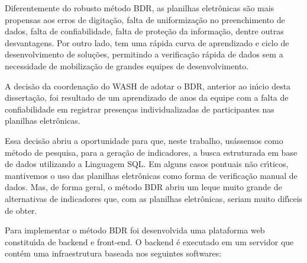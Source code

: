 \documentclass[
12pt,		%
openright,	%
twoside,  %
a4paper,			%
chapter=TITLE,		%
english,			%
french,				%
spanish,			%
brazil				%
]{USPSC-classe/USPSC}
\begin{document}
Diferentemente do robusto m\'etodo BDR, as planilhas eletr\^onicas s\~ao mais propensas aos erros de digita\c{c}\~ao, falta de uniformiza\c{c}\~ao no preenchimento de dados, falta de confiabilidade, falta de prote\c{c}\~ao da informa\c{c}\~ao, dentre outras desvantagens. Por outro lado, tem uma r\'apida curva de aprendizado e ciclo de desenvolvimento de solu\c{c}\~oes, permitindo a verifica\c{c}\~ao r\'apida de dados sem a necessidade de mobiliza\c{c}\~ao de grandes equipes de desenvolvimento.

















A decis\~ao da coordena\c{c}\~ao do WASH de adotar o BDR, anterior ao in\'{\i}cio desta disserta\c{c}\~ao, foi resultado de um aprendizado de anos da equipe com a falta de confiabilidade em registrar presen\c{c}as individualizadas de participantes nas planilhas eletr\^onicas.

















Essa decis\~ao abriu a oportunidade para que, neste trabalho, us\'assemos como m\'etodo de pesquisa, para a gera\c{c}\~ao de indicadores, a busca estruturada em base de dados utilizando a Linguagem SQL. Em alguns casos pontuais n\~ao cr\'{\i}ticos, mantivemos o uso das planilhas eletr\^onicas como forma de verifica\c{c}\~ao \textquotedbl manual \textquotedbl  de dados. Mas, de forma geral, o m\'etodo BDR abriu um leque muito grande de alternativas de indicadores que, com as planilhas eletr\^onicas, seriam muito dif\'{\i}ceis de obter.

















Para implementar o m\'etodo BDR foi desenvolvida uma plataforma web constitu\'{\i}da de backend e front-end. O backend \'e executado em um servidor que cont\'em uma infraestrutura baseada nos seguintes softwares:
\end{document}
